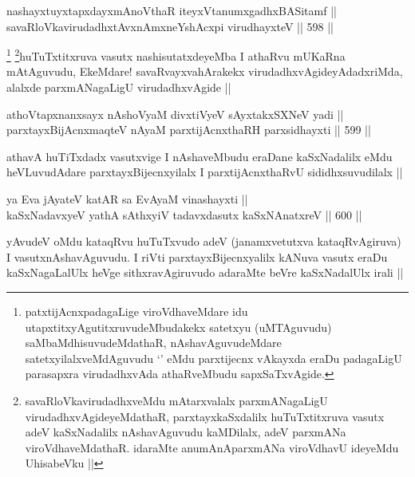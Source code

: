 
\begin{shl}
nashayxtuyxtapxdayxmAnoV\s thaR iteyxVtanumxgadhxBASitamf || \\
savaRloVkavirudadhxtAvxnAmxneYshAcxpi virudhayxteV ||  598 ||  
\end{shl}

\begin{artha}
\footnote{patxtijAcnxpadagaLige viroVdhaveMdare idu utapxtitxyAgutitxruvudeMbudakekx satetxyu (uMTAguvudu) saMbaMdhisuvudeMdathaR, nAshavAguvudeMdare satetxyilalxveMdAguvudu `\stext' eMdu parxtijecnx vAkayxda eraDu padagaLigU parasapxra virudadhxvAda athaRveMbudu sapxSaTxvAgide.}
\footnote{savaRloVkavirudadhxveMdu mAtarxvalalx parxmANagaLigU virudadhxvAgideyeMdathaR, parxtayxkaSxdalilx huTuTxtitxruva vasutx adeV kaSxNadalilx nAshavAguvudu kaMDilalx, adeV parxmANa viroVdhaveMdathaR. idaraMte anumAnAparxmANa viroVdhavU ideyeMdu UhisabeVku ||}huTuTxtitxruva vasutx nashisutatxdeyeMba I athaRvu mUKaRna mAtAguvudu, EkeMdare! savaRvayxvahArakekx virudadhxvAgideyAdadxriMda, alalxde parxmANagaLigU virudadhxvAgide ||
\end{artha}


\begin{shl}
athoVtapxnanxsayx nAshoV\s yaM divxtiVyeV sAyxtakxSXNeV yadi || \\
parxtayxBijAcnxmaqteV nAyaM parxtijAcnxthaRH parxsidhayxti ||  599 ||  
\end{shl}

\begin{artha}
athavA huTiTxdadx vasutxvige I nAshaveMbudu eraDane kaSxNadalilx eMdu heVLuvudAdare parxtayxBijecnxyilalx I parxtijAcnxthaRvU sididhxsuvudilalx ||
\end{artha}


\begin{shl}
ya Eva jAyateV katAR sa EvAyaM vinashayxti || \\
kaSxNadavxyeV yathA sAthxyiV tadavxdasutx kaSxNAnatxreV ||  600 ||  
\end{shl}

\begin{artha}
yAvudeV oMdu kataqRvu huTuTxvudo adeV (janamxvetutxva kataqRvAgiruva) I vasutxnAshavAguvudu. I riVti parxtayxBijecnxyalilx kANuva vasutx eraDu kaSxNagaLalUlx heVge sithxravAgiruvudo adaraMte beVre kaSxNadalUlx irali ||
\end{artha}

